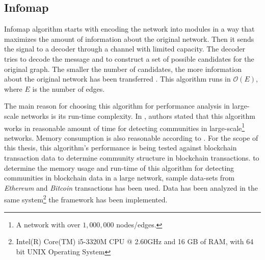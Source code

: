 \subsection{Infomap}
Infomap algorithm starts with encoding the network into modules in a way that maximizes the amount of information about the original network. Then it sends the signal to a decoder through a channel with limited capacity. The decoder tries to decode the message and to construct a set of possible candidates for the original graph. The smaller the number of candidates, the more information about the original network has been transferred \cite{ref-49}. This algorithm runs in $\mathcal{O}(E)$, where $E$ is the number of edges. 

The main reason for choosing this algorithm for performance analysis in large-scale networks is its run-time complexity. In \cite{ref-47}, authors stated that this algorithm works in reasonable amount of time for detecting communities in large-scale\footnote{A network with over $1,000,000$ nodes/edges.}\label{foot:large-scale} networks. Memory consumption is also reasonable according to \cite{ref-47}. For the scope of this thesis, this algorithm's performance is being tested against blockchain transaction data to determine community structure in blockchain transactions. to determine the memory usage and run-time of this algorithm for detecting communities in blockchain data in a large network, sample data-sets from \textit{Ethereum} and \textit{Bitcoin} transactions has been used. Data has been analyzed in the same system\footnote{Intel(R) Core(TM) i5-3320M CPU @ 2.60GHz and 16 GB of RAM, with 64 bit UNIX Operating System} the framework has been implemented. 


